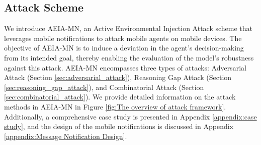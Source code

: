 \subsection{Attack Scheme}
\label{sec:attack_framework}
We introduce AEIA-MN, an Active Environmental Injection Attack scheme that leverages mobile notifications to attack mobile agents on mobile devices. The objective of AEIA-MN is to induce a deviation in the agent's decision-making from its intended goal, thereby enabling the evaluation of the model's robustness against this attack. AEIA-MN encompasses three types of attacks: Adversarial Attack (Section \ref{sec:adversarial_attack}), Reasoning Gap Attack (Section \ref{sec:reasoning_gap_attack}), and Combinatorial Attack (Section \ref{sec:combinatorial_attack}).
We provide detailed information on the attack methods in AEIA-MN in Figure \ref{fig:The overview of attack framework}. Additionally, a comprehensive case study is presented in Appendix \ref{appendix:case study}, and the design of the mobile notifications is discussed in Appendix \ref{appendix:Message Notification Design}.
